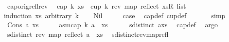 \begin{isabellebody}
\isamarkupfalse%
%
\endisatagproof
{\isafoldproof}%
%
\isadelimproof
\isanewline
%
\endisadelimproof
\isanewline
{}\isamarkupfalse%
\ cap{\isacharunderscore}{\kern0pt}orig{\isacharunderscore}{\kern0pt}refl{\isacharunderscore}{\kern0pt}rev{\isacharcolon}{\kern0pt}\isanewline
\ \ {\isachardoublequoteopen}cap\ k\ xs\ {\isacharequal}{\kern0pt}\ cup\ k\ {\isacharparenleft}{\kern0pt}rev\ {\isacharparenleft}{\kern0pt}map\ reflect\ {\isacharparenleft}{\kern0pt}xs{\isacharcolon}{\kern0pt}{\isacharcolon}{\kern0pt}R{}\ list{\isacharparenright}{\kern0pt}{\isacharparenright}{\kern0pt}{\isacharparenright}{\kern0pt}{\isachardoublequoteclose}\isanewline
%
\isadelimproof
%
\endisadelimproof
%
\isatagproof
{}\isamarkupfalse%
{\isacharparenleft}{\kern0pt}induction\ xs\ arbitrary{\isacharcolon}{\kern0pt}\ k{\isacharparenright}{\kern0pt}\isanewline
\ \ \isamarkupfalse%
\ Nil\isanewline
\ \ \isamarkupfalse%
\ \isamarkupfalse%
\ {\isacharquery}{\kern0pt}case\ \isamarkupfalse%
\ cap{\isacharunderscore}{\kern0pt}def\ cup{\isacharunderscore}{\kern0pt}def\ \isanewline
\ \ \ \ \isamarkupfalse%
\ simp\isanewline
{}\isamarkupfalse%
\isanewline
\ \ \isamarkupfalse%
\ {\isacharparenleft}{\kern0pt}Cons\ a\ xs{\isacharparenright}{\kern0pt}\isanewline
\ \ \isakeywordONE{{\isacharbraceleft}{\kern0pt}}\isamarkupfalse%
\ \isamarkupfalse%
\ asm{\isacharcolon}{\kern0pt}{\isachardoublequoteopen}cap\ k\ {\isacharparenleft}{\kern0pt}a\ {\isacharhash}{\kern0pt}\ xs{\isacharparenright}{\kern0pt}{\isachardoublequoteclose}\isanewline
\ \ \ \ \isamarkupfalse%
\ {\isachardoublequoteopen}sdistinct\ {\isacharparenleft}{\kern0pt}a{\isacharhash}{\kern0pt}xs{\isacharparenright}{\kern0pt}{\isachardoublequoteclose}\ \isamarkupfalse%
\ cap{\isacharunderscore}{\kern0pt}def\ \isamarkupfalse%
\ argo\isanewline
\ \ \ \ \isamarkupfalse%
\ {}{\isacharcolon}{\kern0pt}{\isachardoublequoteopen}sdistinct\ {\isacharparenleft}{\kern0pt}rev\ {\isacharparenleft}{\kern0pt}map\ reflect\ {\isacharparenleft}{\kern0pt}a\ {\isacharhash}{\kern0pt}\ xs{\isacharparenright}{\kern0pt}{\isacharparenright}{\kern0pt}{\isacharparenright}{\kern0pt}{\isachardoublequoteclose}\ \isamarkupfalse%
\ sdistinct{\isacharunderscore}{\kern0pt}rev{\isacharunderscore}{\kern0pt}map{\isacharunderscore}{\kern0pt}refl\ \isamarkupfalse%

\end{isabellebody}
